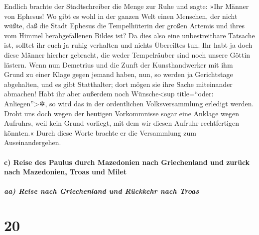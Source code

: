  Endlich brachte der Stadtschreiber die Menge zur Ruhe
und sagte: »Ihr Männer von Ephesus! Wo gibt es wohl in der ganzen Welt
einen Menschen, der nicht wüßte, daß die Stadt Ephesus die Tempelhüterin
der großen Artemis und ihres vom Himmel herabgefallenen Bildes ist?
 Da dies also eine unbestreitbare Tatsache ist, solltet
ihr euch ja ruhig verhalten und nichts Übereiltes tun. 
Ihr habt ja doch diese Männer hierher gebracht, die weder Tempelräuber
sind noch unsere Göttin lästern.  Wenn nun Demetrius und
die Zunft der Kunsthandwerker mit ihm Grund zu einer Klage gegen jemand
haben, nun, so werden ja Gerichtstage abgehalten, und es gibt
Statthalter; dort mögen sie ihre Sache miteinander abmachen!
 Habt ihr aber außerdem noch Wünsche\textless sup
title=``oder: Anliegen''\textgreater✲, so wird das in der ordentlichen
Volksversammlung erledigt werden.  Droht uns doch wegen
der heutigen Vorkommnisse sogar eine Anklage wegen Aufruhrs, weil kein
Grund vorliegt, mit dem wir diesen Aufruhr rechtfertigen könnten.«
 Durch diese Worte brachte er die Versammlung zum
Auseinandergehen.

\hypertarget{c-reise-des-paulus-durch-mazedonien-nach-griechenland-und-zuruxfcck-nach-mazedonien-troas-und-milet}{%
\paragraph{c) Reise des Paulus durch Mazedonien nach Griechenland und
zurück nach Mazedonien, Troas und
Milet}\label{c-reise-des-paulus-durch-mazedonien-nach-griechenland-und-zuruxfcck-nach-mazedonien-troas-und-milet}}

\hypertarget{aa-reise-nach-griechenland-und-ruxfcckkehr-nach-troas}{%
\subparagraph{aa) Reise nach Griechenland und Rückkehr nach
Troas}\label{aa-reise-nach-griechenland-und-ruxfcckkehr-nach-troas}}

\hypertarget{section-19}{%
\section{20}\label{section-19}}

